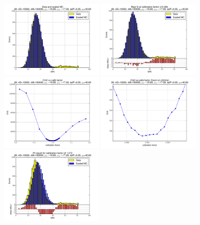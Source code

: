 
 \begin{figure}[htbp] \begin{center} 
\includegraphics[width=0.45\textwidth]{../FIGURES/29/FIG_Data_and_scaled_MC.pdf} 
\includegraphics[width=0.45\textwidth]{../FIGURES/29/FIG_Best_fit_at_calibration_factor_of_0_984.pdf} 
\includegraphics[width=0.45\textwidth]{../FIGURES/29/FIG_Chi2_vs_calib_factor.pdf} 
\includegraphics[width=0.45\textwidth]{../FIGURES/29/FIG_Chi2_vs_calib_factor_Zoom_on_chi2min.pdf} 
\includegraphics[width=0.45\textwidth]{../FIGURES/29/FIG_Fit_result_for_calibration_factor_of_1_072.pdf} 

\end{center}
\end{figure}
